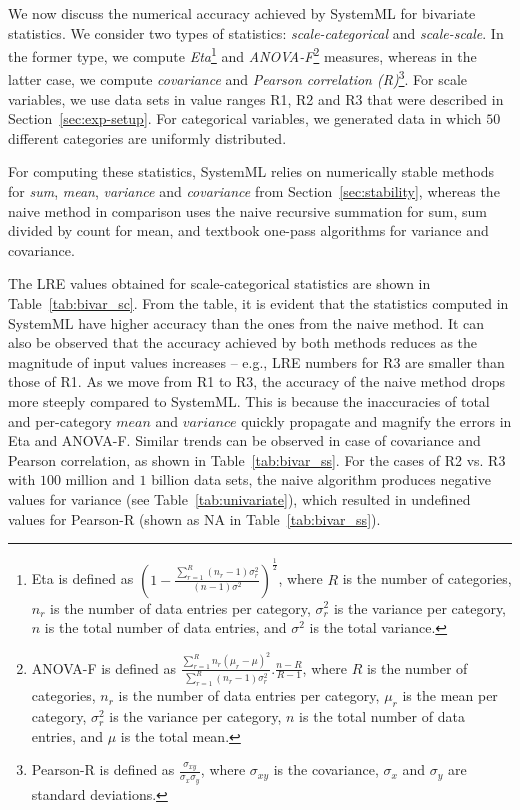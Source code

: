 
We now discuss the numerical accuracy achieved by SystemML for bivariate statistics. We consider two types of statistics: {\em scale-categorical} and {\em scale-scale}. In the former type, we compute {\em Eta}\footnote{Eta is defined as $(1-\frac{\sum\limits_{r=1}^{R}(n_r-1)\sigma_r^2}{(n-1)\sigma^2})^{\frac{1}{2}}$, where $R$ is the number of categories, $n_r$ is the number of data entries per category, $\sigma_r^2$ is the variance per category, $n$ is the total number of data entries, and $\sigma^2$ is the total variance.} and {\em ANOVA-F}\footnote{ANOVA-F is defined as $\frac{\sum\limits_{r=1}^{R}n_r(\mu_r-\mu)^2}{\sum\limits_{r=1}^{R}(n_r-1)\sigma_r^2}.\frac{n-R}{R-1}$, where $R$ is the number of categories, $n_r$ is the number of data entries per category, $\mu_r$ is the mean per category, $\sigma_r^2$ is the variance per category, $n$ is the total number of data entries, and $\mu$ is the total mean.} measures, whereas in the latter case, we compute {\em covariance} and {\em Pearson correlation (R)}\footnote{Pearson-R is defined as $\frac{\sigma_{xy}}{\sigma_x\sigma_y}$, where $\sigma_{xy}$ is the covariance, $\sigma_x$ and $\sigma_y$ are standard deviations.}. For scale variables, we use data sets in value ranges R1, R2 and R3 that were described in Section~\ref{sec:exp-setup}. For categorical variables, we generated data in which $50$ different categories are uniformly distributed.

For computing these statistics, SystemML relies on numerically stable methods for {\em sum}, {\em mean}, {\em variance} and {\em covariance} from Section~\ref{sec:stability}, whereas the naive method in comparison uses the naive recursive summation for sum, sum divided by count for mean, and textbook one-pass algorithms for variance and covariance. 

The LRE values obtained for scale-categorical statistics are shown in Table~\ref{tab:bivar_sc}. From the table, it is evident that the statistics computed in SystemML have higher accuracy than the ones from the naive method. It can also be observed that the accuracy achieved by both methods reduces as the magnitude of input values increases -- e.g., LRE numbers for R3 are smaller than those of R1. As we move from R1 to R3, the accuracy of the naive method drops more steeply compared to SystemML. This is because the inaccuracies of total and per-category $mean$ and $variance$ quickly propagate and magnify the errors in Eta and ANOVA-F. 
Similar trends can be observed in case of covariance and Pearson correlation, as shown in Table~\ref{tab:bivar_ss}. For the cases of R2 vs. R3 with $100$ million and $1$ billion data sets, the naive algorithm produces negative values for variance (see Table~\ref{tab:univariate}), which resulted in undefined values for Pearson-R (shown as NA in Table~\ref{tab:bivar_ss}).

